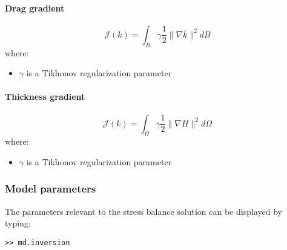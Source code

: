 \paragraph{Drag gradient}%
\begin{equation}
	{\mathcal J\left(k\right)}
	=\int_{B} \gamma \dfrac{1}{2}
	\|\nabla k \|^{2}
	dB
\end{equation}
where:
\begin{itemize}
	\item $\gamma$ is a Tikhonov regularization parameter
\end{itemize}

\paragraph{Thickness gradient}%
\begin{equation}
	{\mathcal J\left(k\right)}
	=\int_{\Omega} \gamma \dfrac{1}{2}
	\|\nabla H \|^{2}
	d\Omega
\end{equation}
where:
\begin{itemize}
	\item $\gamma$ is a Tikhonov regularization parameter
\end{itemize}

\subsubsection{Model parameters}%
The parameters relevant to the stress balance solution can be displayed by typing:
\begin{lstlisting}
>> md.inversion
\end{lstlisting}

